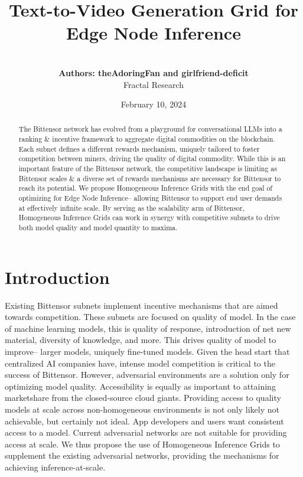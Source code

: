 \documentclass[12pt]{article}
\begin{document}
\title{Text-to-Video Generation Grid for Edge Node Inference}
\author{\\ \textbf{Authors: theAdoringFan and girlfriend-deficit} \\ Fractal Research\\}

\date{February 10, 2024}



\begin{abstract}
The Bittensor network has evolved from a playground for conversational LLMs into a ranking \& incentive framework to aggregate digital commodities on the blockchain. Each subnet defines a different rewards mechanism, uniquely tailored to foster competition between miners, driving the quality of digital commodity. While this is an important feature of the Bittensor network, the competitive landscape is limiting as Bittensor scales \& a diverse set of rewards mechanisms are necessary for Bittensor to reach its potential. We propose Homogeneous Inference Grids with the end goal of optimizing for Edge Node Inference-- allowing Bittensor to support end user demands at effectively infinite scale. By serving as the scalability arm of Bittensor, Homogeneous Inference Grids can work in synergy with competitive subnets to drive both model quality and model quantity to maxima. 
\end{abstract}
\maketitle
\newpage

\section{Introduction}
Existing Bittensor subnets implement incentive mechanisms that are aimed towards competition. These subnets are focused on quality of model. In the case of machine learning models, this is quality of response, introduction of net new material, diversity of knowledge, and more. This drives quality of model to improve-- larger models, uniquely fine-tuned models. Given the head start that centralized AI companies have, intense model competition is critical to the success of Bittensor. However, adversarial environments are a  solution only for optimizing model quality. Accessibility is equally as important to attaining marketshare from the closed-source cloud giants. Providing access to quality models at scale across non-homogeneous environments is not only likely not achievable, but certainly not ideal. App developers and users want consistent access to a model. Current adversarial networks are not suitable for providing access at scale. We thus propose the use of Homogeneous Inference Grids to supplement the existing adversarial networks, providing the mechanisms for achieving inference-at-scale. 
\end{document}
